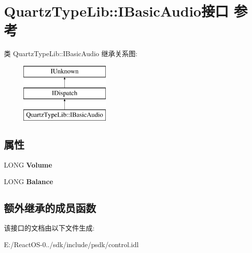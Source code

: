 \hypertarget{interface_quartz_type_lib_1_1_i_basic_audio}{}\section{Quartz\+Type\+Lib\+:\+:I\+Basic\+Audio接口 参考}
\label{interface_quartz_type_lib_1_1_i_basic_audio}
类 Quartz\+Type\+Lib\+:\+:I\+Basic\+Audio 继承关系图\+:\begin{figure}[H]
\begin{center}
\leavevmode
\includegraphics[height=3.000000cm]{interface_quartz_type_lib_1_1_i_basic_audio}
\end{center}
\end{figure}
\subsection*{属性}
\begin{DoxyCompactItemize}
\item 
\mbox{\label{interface_quartz_type_lib_1_1_i_basic_audio_a3f7f9942870890b2a12192681fefa311}} 
L\+O\+NG {\bfseries Volume}
\item 
\mbox{\label{interface_quartz_type_lib_1_1_i_basic_audio_ab8cb9cd0172e137e5a17cc3e986e9233}} 
L\+O\+NG {\bfseries Balance}
\end{DoxyCompactItemize}
\subsection*{额外继承的成员函数}


该接口的文档由以下文件生成\+:\begin{DoxyCompactItemize}
\item 
E\+:/\+React\+O\+S-\/0../sdk/include/psdk/control.\+idl\end{DoxyCompactItemize}
